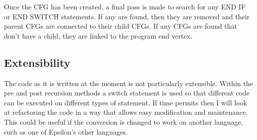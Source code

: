 Once the CFG has been created, a final pass is made to search for any END IF or END SWITCH statements. If any are found, then they are removed and their parent CFGs are connected to their child CFGs. If any CFGs are found that don't have a child, they are linked to the program end vertex.

\subsection{Extensibility}

The code as it is written at the moment is not particularly extensible. Within the pre and post recursion methods a switch statement is used so that different code can be executed on different types of statement. If time permits then I will look at refactoring the code in a way that allows easy modification and maintenance. This could be useful if the conversion is changed to work on another language, such as one of Epsilon's other languages. 